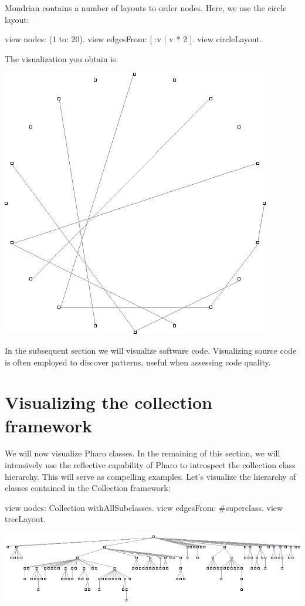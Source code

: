 \documentclass[a4paper,10pt,twoside]{book}
\begin{document}
Mondrian contains a number of layouts to order nodes. Here, we use the circle layout:

\begin{code}{}
view nodes: (1 to: 20).
view edgesFrom: [ :v | v * 2 ].
view circleLayout.
\end{code}

The visualization you obtain is:

\begin{center}\includegraphics[scale=0.4]{picture3}\end{center}

In the subsequent section we will visualize software code. Visualizing source code is often employed to discover patterns, useful when assessing code quality.


\section{Visualizing the collection framework}

We will now visualize Pharo classes. In the remaining of this section, we will intensively use the reflective capability of Pharo to introspect the collection class hierarchy. This will serve as compelling examples. Let's visualize the hierarchy of classes contained in the Collection framework:

\begin{code}{}
view nodes: Collection withAllSubclasses.
view edgesFrom: #superclass.
view treeLayout.
\end{code}
\begin{center}\includegraphics[scale=0.4]{picture4}\end{center}
\end{document}
